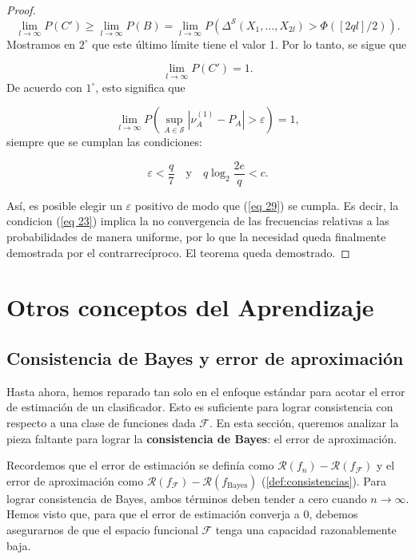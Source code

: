 \documentclass{report}
\begin{document}
\begin{proof}
\[
\lim_{l \to \infty} P(C') \geq \lim_{l \to \infty} P(B) = \lim_{l \to \infty} P(\Delta^{\mathcal{S}}(X_1, \dots, X_{2l}) > \Phi([2q l]/2)).
\]
Mostramos en \( 2^\circ \) que este último límite tiene el valor 1. Por lo tanto, se sigue que 

\[
\lim_{l \to \infty} P(C') = 1.
\]
De acuerdo con \( 1^\circ \), esto significa que 

\begin{equation}\label{eq 29}
\lim_{l \to \infty} P\left( \sup_{A \in \mathcal{S}} \left| \nu_A^{(1)} - P_A \right| > \varepsilon \right) = 1,
\end{equation}
siempre que se cumplan las condiciones:

\[
\varepsilon < \frac{q}{7} \quad \text{y} \quad q \log_2 \frac{2e}{q} < c.
\]\newline

Así, es posible elegir un \( \varepsilon \) positivo de modo que (\ref{eq 29}) se cumpla. Es decir,
la condicion (\ref{eq 23}) implica la no convergencia de las frecuencias relativas a las probabilidades de manera uniforme,
por lo que la necesidad queda finalmente demostrada por el contrarrecíproco. El teorema queda demostrado.

\end{proof}
    











\chapter{Otros conceptos del Aprendizaje}
\section{Consistencia de Bayes y error de aproximación}

Hasta ahora, hemos reparado tan solo en el enfoque estándar para acotar el error de estimación 
de un clasificador. Esto es suficiente para lograr consistencia con respecto a una clase de funciones 
dada \(\mathcal{F}\). En esta sección, queremos analizar la pieza faltante para lograr la 
\textbf{consistencia de Bayes}: el error de aproximación.\newline

Recordemos que el error de estimación se definía como \(\mathcal{R}(f_n) - \mathcal{R}(f_{\mathcal{F}})\) 
y el error de aproximación como \(\mathcal{R}(f_{\mathcal{F}}) - \mathcal{R}(f_{\text{Bayes}})\) 
(\ref{def:consistencias}). Para lograr consistencia de Bayes, ambos términos deben tender a cero cuando 
\(n \to \infty\). Hemos visto que, para que el error de estimación converja a \(0\), debemos 
asegurarnos de que el espacio funcional \(\mathcal{F}\) tenga una capacidad razonablemente baja.\newline
\end{document}
